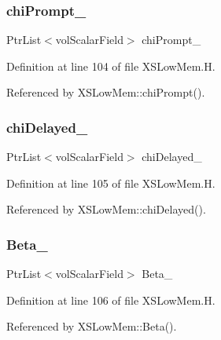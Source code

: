 \subsubsection{\texorpdfstring{chi\+Prompt\+\_\+}{chiPrompt\_}}
{\footnotesize\ttfamily Ptr\+List$<$vol\+Scalar\+Field$>$ chi\+Prompt\+\_\+\hspace{0.3cm}{\ttfamily [protected]}}



Definition at line 104 of file X\+S\+Low\+Mem.\+H.



Referenced by X\+S\+Low\+Mem\+::chi\+Prompt().

\mbox{\label{classFoam_1_1XSLowMem_ab5552da3b10e90d186bf98aead06bcd4}} 
\subsubsection{\texorpdfstring{chi\+Delayed\+\_\+}{chiDelayed\_}}
{\footnotesize\ttfamily Ptr\+List$<$vol\+Scalar\+Field$>$ chi\+Delayed\+\_\+\hspace{0.3cm}{\ttfamily [protected]}}



Definition at line 105 of file X\+S\+Low\+Mem.\+H.



Referenced by X\+S\+Low\+Mem\+::chi\+Delayed().

\mbox{\label{classFoam_1_1XSLowMem_a7f7fe9267b6666b38fa5534851251f7b}} 
\subsubsection{\texorpdfstring{Beta\+\_\+}{Beta\_}}
{\footnotesize\ttfamily Ptr\+List$<$vol\+Scalar\+Field$>$ Beta\+\_\+\hspace{0.3cm}{\ttfamily [protected]}}



Definition at line 106 of file X\+S\+Low\+Mem.\+H.



Referenced by X\+S\+Low\+Mem\+::\+Beta().

